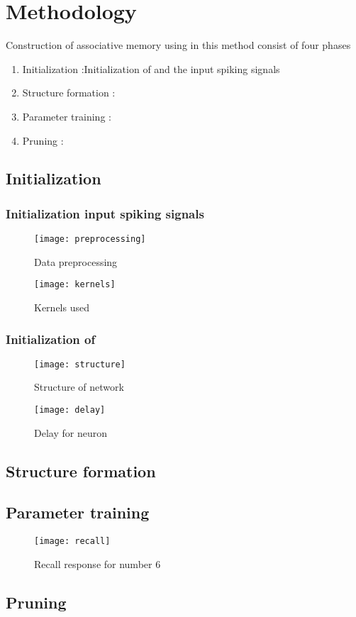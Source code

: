 \chapter{Methodology}%
Construction of associative memory using \Snn\cite{base} in this method consist of four phases
\begin{enumerate}
    \item Initialization :Initialization of \Snn and the input spiking signals
    \item Structure formation :
    \item Parameter training :
    \item Pruning :
\end{enumerate}
\section{Initialization}
\subsection{Initialization input spiking signals}
\begin{figure}[h!]
    \centering
    \texttt{[image: preprocessing]}
    \caption{Data preprocessing}
    \label{preprocessing}
\end{figure}
\begin{figure}[h!]
    \centering
    \texttt{[image: kernels]}
    \caption{Kernels used}
    \label{kernel}
\end{figure}
\subsection{Initialization of \Snn}
\begin{figure}[h!]
    \centering
    \texttt{[image: structure]}
    \caption{Structure of network}
    \label{structure}
\end{figure}
\begin{figure}[h!]
    \centering
    \texttt{[image: delay]}
    \caption{Delay for neuron}
    \label{delay}
\end{figure}
\section{Structure formation}
\section{Parameter training}
\begin{figure}[h!]
    \centering
    \texttt{[image: recall]}
    \caption{Recall response for number 6}
    \label{recall}
\end{figure}
\section{Pruning}
